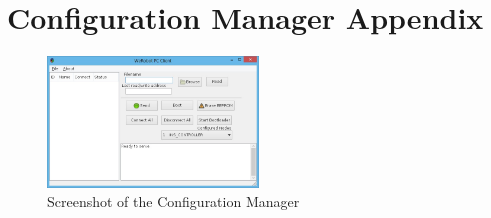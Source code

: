 \section{Configuration Manager Appendix}\label{sec:cm_appendix}

\begin{figure}[h]
    \includegraphics[width=0.5\textwidth]{./figure/cm.jpg}
    \caption{Screenshot of the Configuration Manager}
    \label{fig:cm_figure}
\end{figure}


